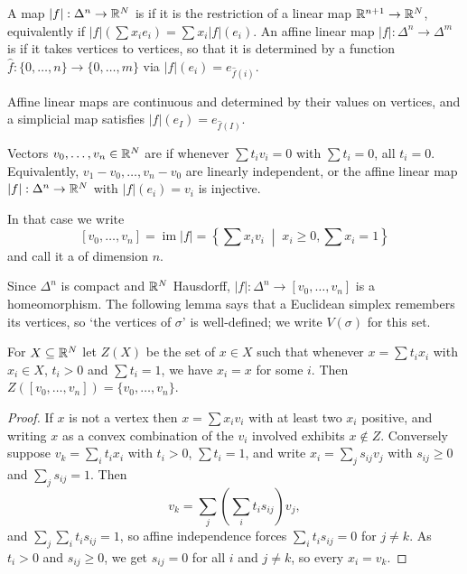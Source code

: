 \documentclass[a4paper]{scrartcl}
\begin{document}
\begin{definition}
	A map $|f|: \Delta^n \to \mathbb{R}^N$ is  if it is the restriction of a linear map $\mathbb{R}^{n+1}\to\mathbb{R}^N$, equivalently if $|f|(\sum x_ie_i) = \sum x_i |f|(e_i)$. An affine linear map $|f|: \Delta^n \to \Delta^m$ is  if it takes vertices to vertices, so that it is determined by a function $\hat f: \{0,\dots,n\} \to \{0,\dots,m\}$ via $|f|(e_i) = e_{\hat f(i)}$.
\end{definition}

Affine linear maps are continuous and determined by their values on vertices, and a
simplicial map satisfies $|f|(e_I) = e_{\hat f(I)}$.

\begin{definition}
	Vectors $v_0,\dots,v_n \in \mathbb{R}^N$ are  if whenever $\sum t_iv_i = 0$ with $\sum t_i = 0$, all $t_i = 0$. Equivalently, $v_1 - v_0, \dots, v_n - v_0$ are linearly independent, or the affine linear map $|f|: \Delta^n \to \mathbb{R}^N$ with $|f|(e_i) = v_i$ is injective.

	In that case we write
	$$
	[v_0,\dots,v_n] = \operatorname{im}|f| = \left\{\sum x_iv_i \;\middle|\; x_i \geq 0, \sum x_i = 1\right\}
	$$
	and call it a  of dimension $n$.
\end{definition}

Since $\Delta^n$ is compact and $\mathbb{R}^N$ Hausdorff, $|f|: \Delta^n \to [v_0,\dots,v_n]$ is a
homeomorphism. The following lemma says that a Euclidean simplex remembers its vertices,
so `the vertices of $\sigma$' is well-defined; we write $V(\sigma)$ for this set.

\begin{lemma} \label{lem:simplex-vertices}
	For $X \subseteq \mathbb{R}^N$ let $Z(X)$ be the set of $x \in X$ such that whenever $x = \sum t_ix_i$ with $x_i \in X$, $t_i > 0$ and $\sum t_i = 1$, we have $x_i = x$ for some $i$. Then $Z([v_0,\dots,v_n]) = \{v_0,\dots,v_n\}$.
\end{lemma}
\begin{proof}
	If $x$ is not a vertex then $x = \sum x_iv_i$ with at least two $x_i$ positive, and writing $x$ as a convex combination of the $v_i$ involved exhibits $x \notin Z$. Conversely suppose $v_k = \sum_i t_ix_i$ with $t_i > 0$, $\sum t_i = 1$, and write $x_i = \sum_j s_{ij}v_j$ with $s_{ij}\geq 0$ and $\sum_j s_{ij} = 1$. Then
	$$
	v_k = \sum_j \left(\sum_i t_is_{ij}\right)v_j,
	$$
	and $\sum_j\sum_i t_is_{ij} = 1$, so affine independence forces $\sum_i t_is_{ij} = 0$ for $j \neq k$. As $t_i > 0$ and $s_{ij}\geq 0$, we get $s_{ij} = 0$ for all $i$ and $j \neq k$, so every $x_i = v_k$.
\end{proof}
\end{document}
